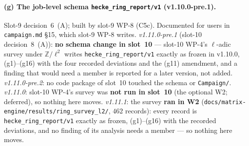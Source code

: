 \documentclass[11pt]{article}
\theoremstyle{remark}
\newcommand{\Z}{\mathbb{Z}}
\begin{document}
\paragraph{(g) The job-level schema \texttt{hecke\_ring\_report/v1} (v1.10.0-pre.1).}
Slot-9 decision~6~(A); built by slot-9 WP-8 (C5c). Documented for users in \texttt{campaign.md}
\S15, which slot-9 WP-8 writes. \emph{v1.11.0-pre.1} (slot-10 decision~8~(A)): \textbf{no schema
change in slot~10} --- slot-10 WP-4's $\ell$-adic survey under $\Z/\ell^2$ writes
\texttt{hecke\_ring\_report/v1} exactly as frozen in v1.10.0, (g1)--(g16) with the four recorded
deviations and the (g11) amendment, and a finding that would need a member is reported for a later
version, not added. \emph{v1.11.0-pre.2}: no code package of slot~10 touched the schema or
\texttt{Campaign/}. \emph{v1.11.0}: slot-10 WP-4's survey was \textbf{not run in slot~10} (the
optional W2; deferred), so nothing here moves. \emph{v1.11.1}: the survey \textbf{ran in W2}
(\texttt{docs/matrix-engine/results/ring\_survey\_l2/}, $462$ records): every record is
\texttt{hecke\_ring\_report/v1} exactly as frozen, (g1)--(g16) with the recorded deviations, and no
finding of its analysis needs a member --- so nothing here moves.
\end{document}
